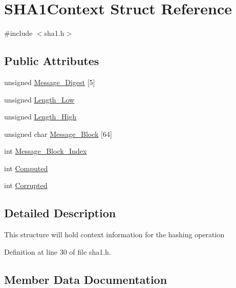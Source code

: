 \hypertarget{structSHA1Context}{}\section{S\+H\+A1\+Context Struct Reference}
\label{structSHA1Context}


{\ttfamily \#include $<$sha1.\+h$>$}

\subsection*{Public Attributes}
\begin{DoxyCompactItemize}
\item 
unsigned \hyperlink{structSHA1Context_a33ef73a6e4eb34e1e251662c18e36ad3}{Message\+\_\+\+Digest} \mbox{[}5\mbox{]}
\item 
unsigned \hyperlink{structSHA1Context_abefecf979a4abf17d8783c32232d6b09}{Length\+\_\+\+Low}
\item 
unsigned \hyperlink{structSHA1Context_afed0372c5ff46f0005c1595c0cc029fb}{Length\+\_\+\+High}
\item 
unsigned char \hyperlink{structSHA1Context_ac29c71f56046f207c9c0f7bcc0bd8a2e}{Message\+\_\+\+Block} \mbox{[}64\mbox{]}
\item 
int \hyperlink{structSHA1Context_a833f19a2e09ac6615dc77525f336c598}{Message\+\_\+\+Block\+\_\+\+Index}
\item 
int \hyperlink{structSHA1Context_a3722d8be51c7a1a4e8083c3f1a5adfa1}{Computed}
\item 
int \hyperlink{structSHA1Context_af549987a735051dc4b3b50b106fde5bb}{Corrupted}
\end{DoxyCompactItemize}


\subsection{Detailed Description}
This structure will hold context information for the hashing operation 

Definition at line 30 of file sha1.\+h.



\subsection{Member Data Documentation}
\hypertarget{structSHA1Context_a3722d8be51c7a1a4e8083c3f1a5adfa1}{}
